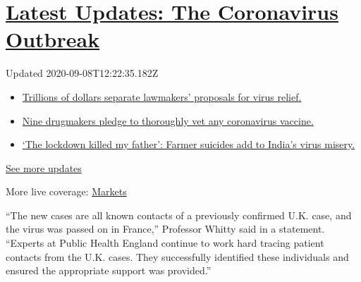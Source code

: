 \hypertarget{latest-updates-the-coronavirus-outbreak}{%
\section{\texorpdfstring{\href{https://www.nytimes3xbfgragh.onion/2020/09/08/world/covid-19-coronavirus.html?action=click\&pgtype=Article\&state=default\&region=MAIN_CONTENT_1\&context=storylines_live_updates}{Latest
Updates: The Coronavirus
Outbreak}}{Latest Updates: The Coronavirus Outbreak}}\label{latest-updates-the-coronavirus-outbreak}}

Updated 2020-09-08T12:22:35.182Z

\begin{itemize}
\tightlist
\item
  \href{https://www.nytimes3xbfgragh.onion/2020/09/08/world/covid-19-coronavirus.html?action=click\&pgtype=Article\&state=default\&region=MAIN_CONTENT_1\&context=storylines_live_updates\#link-46162376}{Trillions
  of dollars separate lawmakers' proposals for virus relief.}
\item
  \href{https://www.nytimes3xbfgragh.onion/2020/09/08/world/covid-19-coronavirus.html?action=click\&pgtype=Article\&state=default\&region=MAIN_CONTENT_1\&context=storylines_live_updates\#link-679303d7}{Nine
  drugmakers pledge to thoroughly vet any coronavirus vaccine.}
\item
  \href{https://www.nytimes3xbfgragh.onion/2020/09/08/world/covid-19-coronavirus.html?action=click\&pgtype=Article\&state=default\&region=MAIN_CONTENT_1\&context=storylines_live_updates\#link-1c973131}{`The
  lockdown killed my father': Farmer suicides add to India's virus
  misery.}
\end{itemize}

\href{https://www.nytimes3xbfgragh.onion/2020/09/08/world/covid-19-coronavirus.html?action=click\&pgtype=Article\&state=default\&region=MAIN_CONTENT_1\&context=storylines_live_updates}{See
more updates}

More live coverage:
\href{https://www.nytimes3xbfgragh.onion/live/2020/09/08/business/stock-market-today-coronavirus?action=click\&pgtype=Article\&state=default\&region=MAIN_CONTENT_1\&context=storylines_live_updates}{Markets}

``The new cases are all known contacts of a previously confirmed U.K.
case, and the virus was passed on in France,'' Professor Whitty said in
a statement. ``Experts at Public Health England continue to work hard
tracing patient contacts from the U.K. cases. They successfully
identified these individuals and ensured the appropriate support was
provided.''


